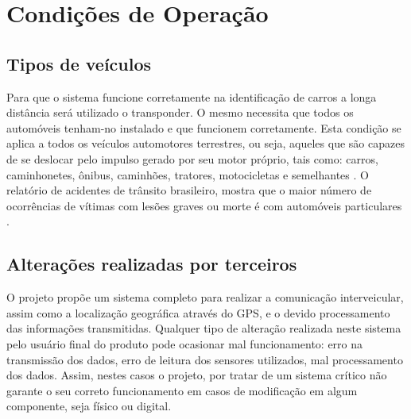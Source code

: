 \chapter[Condições de Operação]{Condições de Operação}

\section{Tipos de veículos}
Para que o sistema funcione corretamente na identificação de carros a longa distância será utilizado o transponder. O mesmo necessita que todos os automóveis tenham-no instalado e que funcionem corretamente. Esta condição se aplica a todos os veículos automotores terrestres, ou seja, aqueles que são capazes de se deslocar pelo impulso gerado por seu motor próprio, tais como: carros, caminhonetes, ônibus, caminhões, tratores, motocicletas e semelhantes \cite{egov}. O relatório de acidentes de trânsito brasileiro, mostra que o maior número de ocorrências de vítimas com lesões graves ou morte é com automóveis particulares \cite{ipea2}.

\section{Alterações realizadas por terceiros}
O projeto propõe um sistema completo para realizar a comunicação interveicular, assim como a localização geográfica através do GPS, e o devido processamento das informações transmitidas. Qualquer tipo de alteração realizada neste sistema pelo usuário final do produto pode ocasionar mal funcionamento: erro na transmissão dos dados, erro de leitura dos sensores utilizados, mal processamento dos dados. Assim, nestes casos o projeto, por tratar de um sistema crítico não garante o seu correto funcionamento em casos de modificação em algum componente, seja físico ou digital.
